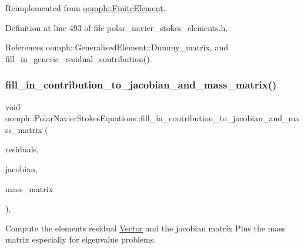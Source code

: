 Reimplemented from \hyperlink{classoomph_1_1FiniteElement_a0ae7af222af38a0d53bf283dc85bdfea}{oomph\+::\+Finite\+Element}.



Definition at line 493 of file polar\+\_\+navier\+\_\+stokes\+\_\+elements.\+h.



References oomph\+::\+Generalised\+Element\+::\+Dummy\+\_\+matrix, and fill\+\_\+in\+\_\+generic\+\_\+residual\+\_\+contribution().

\mbox{\label{classoomph_1_1PolarNavierStokesEquations_ae4962724a42bb1f6ccdc080bef2c69a1}} 
\subsubsection{\texorpdfstring{fill\+\_\+in\+\_\+contribution\+\_\+to\+\_\+jacobian\+\_\+and\+\_\+mass\+\_\+matrix()}{fill\_in\_contribution\_to\_jacobian\_and\_mass\_matrix()}}
{\footnotesize\ttfamily void oomph\+::\+Polar\+Navier\+Stokes\+Equations\+::fill\+\_\+in\+\_\+contribution\+\_\+to\+\_\+jacobian\+\_\+and\+\_\+mass\+\_\+matrix (\begin{DoxyParamCaption}\item[{\hyperlink{classoomph_1_1Vector}{Vector}$<$ double $>$ \&}]{residuals,  }\item[{\hyperlink{classoomph_1_1DenseMatrix}{Dense\+Matrix}$<$ double $>$ \&}]{jacobian,  }\item[{\hyperlink{classoomph_1_1DenseMatrix}{Dense\+Matrix}$<$ double $>$ \&}]{mass\+\_\+matrix }\end{DoxyParamCaption})\hspace{0.3cm}{\ttfamily [inline]}, {\ttfamily [virtual]}}



Compute the element\textquotesingle{}s residual \hyperlink{classoomph_1_1Vector}{Vector} and the jacobian matrix Plus the mass matrix especially for eigenvalue problems. 



